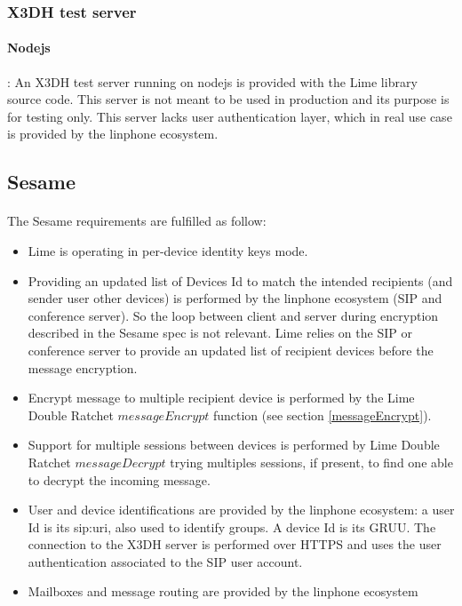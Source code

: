 \documentclass[a4paper,11pt]{article}
\begin{document}
    \subsubsection{X3DH test server}
      \paragraph*{Nodejs}: An X3DH test server running on nodejs is provided with the Lime library source code. This server is not meant to be used in production and its purpose is for testing only. This server lacks user authentication layer, which in real use case is provided by the linphone ecosystem.
  \subsection{Sesame}
    \paragraph{}The Sesame requirements are fulfilled as follow:
    \begin{itemize}
      \item Lime is operating in per-device identity keys mode.
      \item Providing an updated list of Devices Id to match the intended recipients (and sender user other devices) is performed by the linphone ecosystem (SIP and conference server). So the loop between client and server during encryption described in the Sesame spec\cite{sesame} is not relevant. Lime relies on the SIP or conference server to provide an updated list of recipient devices before the message encryption.
      \item Encrypt message to multiple recipient device is performed by the Lime Double Ratchet $messageEncrypt$ function (see section \ref{messageEncrypt}).
      \item Support for multiple sessions between devices is performed by Lime Double Ratchet $messageDecrypt$ trying multiples sessions, if present, to find one able to decrypt the incoming message.
      \item User and device identifications are provided by the linphone ecosystem: a user Id is its sip:uri, also used to identify groups. A device Id is its GRUU\cite{rfc5627}. The connection to the X3DH server is performed over HTTPS and uses the user authentication associated to the SIP user account.
      \item Mailboxes and message routing are provided by the linphone ecosystem
    \end{itemize}
   
\end{document}

